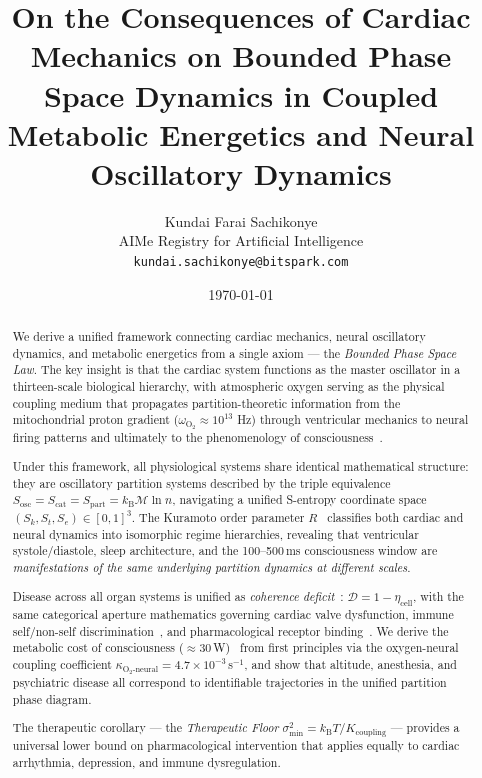 \documentclass[10pt,twocolumn,a4paper]{article}
\title{\textbf{On the Consequences of Cardiac Mechanics on Bounded Phase Space Dynamics in Coupled Metabolic Energetics and Neural Oscillatory Dynamics}\\[0.5em]
}
\author{
Kundai Farai Sachikonye\\
AIMe Registry for Artificial Intelligence\\
\texttt{kundai.sachikonye@bitspark.com}
}
\date{\today}
\theoremstyle{definition}
\newcommand{\Sosc}{S_{\text{osc}}}
\newcommand{\Scat}{S_{\text{cat}}}
\newcommand{\Spart}{S_{\text{part}}}
\newcommand{\kB}{k_{\text{B}}}
\newcommand{\kBT}{k_{\text{B}}T}
\begin{document}
\maketitle

\begin{abstract}
We derive a unified framework connecting cardiac mechanics, neural oscillatory dynamics,
and metabolic energetics from a single axiom — the \emph{Bounded Phase Space Law}.
The key insight is that the cardiac system functions as the master oscillator in a
thirteen-scale biological hierarchy, with atmospheric oxygen serving as the physical
coupling medium that propagates partition-theoretic information from the mitochondrial
proton gradient ($\omega_{\text{O}_2} \approx 10^{13}$ Hz) through ventricular mechanics
to neural firing patterns and ultimately to the phenomenology of consciousness~\cite{sachikonye2024cardiovascular,sachikonye2024cardiac}.

Under this framework, all physiological systems share identical mathematical structure:
they are oscillatory partition systems described by the triple equivalence
$\Sosc = \Scat = \Spart = \kB \mathcal{M} \ln n$, navigating a unified
S-entropy coordinate space $(S_k, S_t, S_e) \in [0,1]^3$. The Kuramoto order parameter
$R$~\cite{kuramoto1975self,kuramoto1984chemical} classifies both cardiac and neural dynamics into isomorphic regime hierarchies,
revealing that ventricular systole/diastole, sleep architecture, and the
100--500\,ms consciousness window are \emph{manifestations of the same underlying
partition dynamics at different scales}.

Disease across all organ systems is unified as \emph{coherence deficit}~\cite{goldberger2002fractal}:
$\mathcal{D} = 1 - \eta_{\text{cell}}$, with the same categorical aperture mathematics
governing cardiac valve dysfunction, immune self/non-self discrimination~\cite{tonegawa1983somatic}, and
pharmacological receptor binding~\cite{hill1910possible}. We derive the metabolic cost of consciousness
($\approx 30$\,W)~\cite{attwell2001energy,raichle2002appraising} from first principles via the oxygen-neural coupling coefficient
$\kappa_{\text{O}_2\text{-neural}} = 4.7 \times 10^{-3}$\,s$^{-1}$, and show that
altitude, anesthesia, and psychiatric disease all correspond to identifiable
trajectories in the unified partition phase diagram.

The therapeutic corollary — the \emph{Therapeutic Floor}
$\sigma^2_{\min} = \kBT / K_{\text{coupling}}$ — provides a universal lower bound
on pharmacological intervention that applies equally to cardiac arrhythmia,
depression, and immune dysregulation.
\end{abstract}
\end{document}
